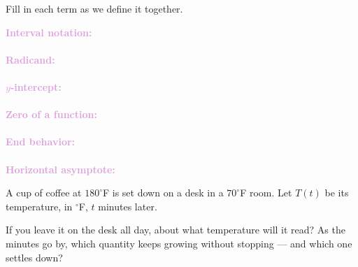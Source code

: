 \documentclass[10pt]{article}
\begin{document}

\vspace{0.12in}

\boxguard
\begin{vocabbox}
Fill in each term as we define it together.
\par\vspace{2pt}
\noindent\textbf{\textcolor{plum}{Interval notation:}}\\[1pt]
\writeline\\[3pt]
\noindent\textbf{\textcolor{plum}{Radicand:}}\\[1pt]
\writeline\\[3pt]
\noindent\textbf{\textcolor{plum}{$y$-intercept:}}\\[1pt]
\writeline\\[3pt]
\noindent\textbf{\textcolor{plum}{Zero of a function:}}\\[1pt]
\writeline\\[3pt]
\noindent\textbf{\textcolor{plum}{End behavior:}}\\[1pt]
\writeline\\[3pt]
\noindent\textbf{\textcolor{plum}{Horizontal asymptote:}}\\[1pt]
\writeline
\end{vocabbox}

\vspace{0.1in}

\boxguard
\begin{hookbox}
A cup of coffee at $180^\circ$F is set down on a desk in a $70^\circ$F room. Let $T(t)$ be its
temperature, in $^\circ$F, $t$ minutes later.

If you leave it on the desk all day, about what temperature will it read? As the minutes go
by, which quantity keeps growing without stopping --- and which one settles down?
\par{}
\end{hookbox}
\end{document}

